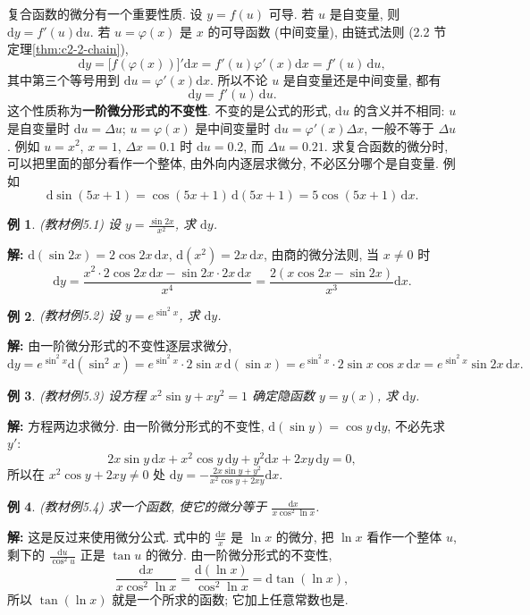 \documentclass[UTF8,openany]{ctexbook}
\theoremstyle{chinesetextbook}
\newtheorem{example}{例}[section]
\newenvironment{cnsolution}{\par\indent\textbf{解:} \ignorespaces}{\par}
\newcommand{\dd}{\mathrm d}
\begin{document}
复合函数的微分有一个重要性质. 设 $y=f(u)$ 可导. 若 $u$ 是自变量, 则 $\dd y=f'(u)\dd u$. 若 $u=\varphi(x)$ 是 $x$ 的可导函数 (中间变量), 由链式法则 (2.2 节定理\ref{thm:c2-2-chain}),
\[
\dd y=\bigl[f(\varphi(x))\bigr]'\dd x=f'(u)\varphi'(x)\dd x=f'(u)\,\dd u,
\]
其中第三个等号用到 $\dd u=\varphi'(x)\dd x$. 所以不论 $u$ 是自变量还是中间变量, 都有
\[
\dd y=f'(u)\,\dd u.
\]
这个性质称为\textbf{一阶微分形式的不变性}. 不变的是公式的形式, $\dd u$ 的含义并不相同: $u$ 是自变量时 $\dd u=\Delta u$; $u=\varphi(x)$ 是中间变量时 $\dd u=\varphi'(x)\Delta x$, 一般不等于 $\Delta u$. 例如 $u=x^2$, $x=1$, $\Delta x=0.1$ 时 $\dd u=0.2$, 而 $\Delta u=0.21$. 求复合函数的微分时, 可以把里面的部分看作一个整体, 由外向内逐层求微分, 不必区分哪个是自变量. 例如
\[
\dd\sin(5x+1)=\cos(5x+1)\,\dd(5x+1)=5\cos(5x+1)\,\dd x.
\]
\begin{example}\label{ex:c2-5-1}
\textnormal{(教材例5.1)} 设 $\displaystyle y=\frac{\sin2x}{x^2}$, 求 $\dd y$.
\end{example}
\begin{cnsolution}
$\dd(\sin2x)=2\cos2x\,\dd x$, $\dd(x^2)=2x\,\dd x$, 由商的微分法则, 当 $x\ne0$ 时
\[
\dd y=\frac{x^2\cdot2\cos2x\,\dd x-\sin2x\cdot2x\,\dd x}{x^4}=\frac{2(x\cos2x-\sin2x)}{x^3}\dd x.
\]
\end{cnsolution}
\begin{example}\label{ex:c2-5-2}
\textnormal{(教材例5.2)} 设 $y=e^{\sin^2x}$, 求 $\dd y$.
\end{example}
\begin{cnsolution}
由一阶微分形式的不变性逐层求微分,
\[
\dd y=e^{\sin^2x}\dd(\sin^2x)=e^{\sin^2x}\cdot2\sin x\,\dd(\sin x)=e^{\sin^2x}\cdot2\sin x\cos x\,\dd x=e^{\sin^2x}\sin2x\,\dd x.
\]
\end{cnsolution}
\begin{example}\label{ex:c2-5-3}
\textnormal{(教材例5.3)} 设方程 $x^2\sin y+xy^2=1$ 确定隐函数 $y=y(x)$, 求 $\dd y$.
\end{example}
\begin{cnsolution}
方程两边求微分. 由一阶微分形式的不变性, $\dd(\sin y)=\cos y\,\dd y$, 不必先求 $y'$:
\[
2x\sin y\,\dd x+x^2\cos y\,\dd y+y^2\dd x+2xy\,\dd y=0,
\]
所以在 $x^2\cos y+2xy\ne0$ 处 $\displaystyle\dd y=-\frac{2x\sin y+y^2}{x^2\cos y+2xy}\dd x$.
\end{cnsolution}
\begin{example}\label{ex:c2-5-4}
\textnormal{(教材例5.4)} 求一个函数, 使它的微分等于 $\displaystyle\frac{\dd x}{x\cos^2\ln x}$.
\end{example}
\begin{cnsolution}
这是反过来使用微分公式. 式中的 $\displaystyle\frac{\dd x}x$ 是 $\ln x$ 的微分, 把 $\ln x$ 看作一个整体 $u$, 剩下的 $\displaystyle\frac{\dd u}{\cos^2u}$ 正是 $\tan u$ 的微分. 由一阶微分形式的不变性,
\[
\frac{\dd x}{x\cos^2\ln x}=\frac{\dd(\ln x)}{\cos^2\ln x}=\dd\tan(\ln x),
\]
所以 $\tan(\ln x)$ 就是一个所求的函数; 它加上任意常数也是.
\end{cnsolution}
\end{document}
